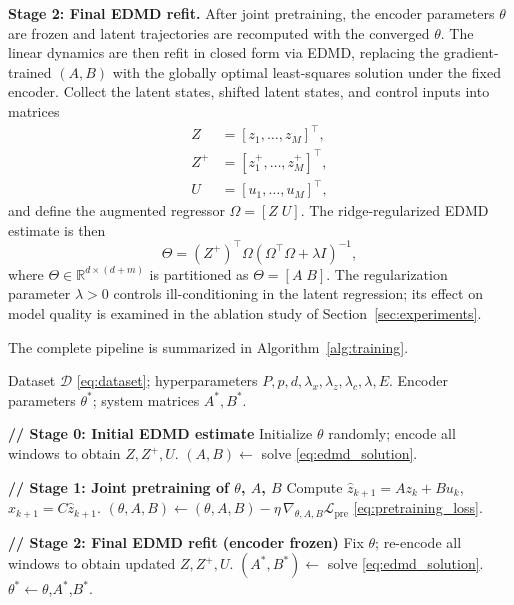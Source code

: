 \documentclass[journal]{IEEEtran}
\begin{document}
\textbf{Stage 2: Final EDMD refit.}
After joint pretraining, the encoder parameters $\theta$ are frozen and latent trajectories are recomputed with the converged $\theta$. The linear dynamics are then refit in closed form via EDMD, replacing the gradient-trained $(A,B)$ with the globally optimal least-squares solution under the fixed encoder. Collect the latent states, shifted latent states, and control inputs into matrices
\begin{align}
    Z &= [z_1,\ldots,z_M]^\top, \\
    Z^{+} &= [z_1^{+},\ldots,z_M^{+}]^\top, \\
    U &= [u_1,\ldots,u_M]^\top,
\end{align}
and define the augmented regressor $\Omega=[Z\;U]$. The ridge-regularized EDMD estimate is then
\begin{equation}
    \Theta = (Z^{+})^\top \Omega
    \left(\Omega^\top\Omega + \lambda I\right)^{-1},
    \label{eq:edmd_solution}
\end{equation}
where $\Theta \in \mathbb{R}^{d\times(d+m)}$ is partitioned as $\Theta = [A\;B]$. The regularization parameter $\lambda > 0$ controls ill-conditioning in the latent regression; its effect on model quality is examined in the ablation study of Section~\ref{sec:experiments}.

The complete pipeline is summarized in Algorithm~\ref{alg:training}.

\begin{algorithm}[!t]
\caption{Transformer-Koopman Training Pipeline}
\label{alg:training}
\begin{algorithmic}[1]
\REQUIRE Dataset $\mathcal{D}$ \eqref{eq:dataset}; hyperparameters $P,p,d,\lambda_x,\lambda_z,\lambda_c,\lambda,E$.
\ENSURE Encoder parameters $\theta^{*}$; system matrices $A^{*},B^{*}$.

\STATE \textbf{// Stage 0: Initial EDMD estimate}
\STATE Initialize $\theta$ randomly; encode all windows to obtain $Z,Z^{+},U$.
\STATE $(A,B)\leftarrow$ solve \eqref{eq:edmd_solution}. \hfill{}

\STATE \textbf{// Stage 1: Joint pretraining of $\theta$, $A$, $B$}
        \STATE Compute $\hat{z}_{k+1}=Az_k+Bu_k$,\; $\hat{x}_{k+1}=C\hat{z}_{k+1}$.
        \STATE $(\theta,A,B)\leftarrow(\theta,A,B) - \eta\,\nabla_{\theta,A,B}\mathcal{L}_{\mathrm{pre}}$ \eqref{eq:pretraining_loss}.
    \ENDFOR
\ENDFOR

\STATE \textbf{// Stage 2: Final EDMD refit (encoder frozen)}
\STATE Fix $\theta$; re-encode all windows to obtain updated $Z,Z^{+},U$.
\STATE $(A^{*},B^{*})\leftarrow$ solve \eqref{eq:edmd_solution}.
\RETURN $\theta^{*}\leftarrow\theta$,\;$A^{*}$,\;$B^{*}$.
\end{algorithmic}
\end{algorithm}
\end{document}
